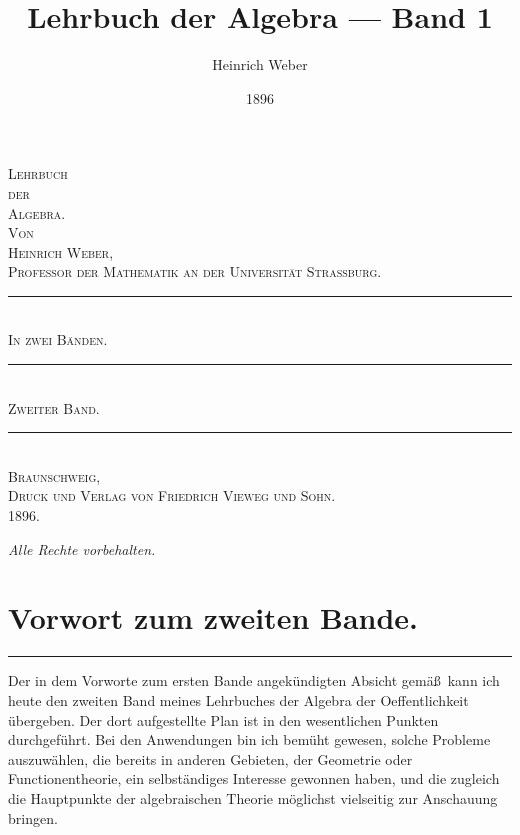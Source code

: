 \documentclass[12pt,a4paper]{book}
\title{Lehrbuch der Algebra --- Band 1}
\author{Heinrich Weber}
\date{1896}
\begin{document}
\frontmatter
\begin{titlepage}
\begin{center}
\vspace*{2cm}
{\Huge\textsc{Lehrbuch}}\\[0.5cm]
{\large\textsc{der}}\\[0.5cm]
{\Huge\textsc{Algebra.}}\\[1.5cm]
{\large\textsc{Von}}\\[0.5cm]
{\LARGE\textsc{Heinrich Weber,}}\\[0.3cm]
{\small\textsc{Professor der Mathematik an der Universit\"at Strassburg.}}\\[1.5cm]
\rule{5cm}{0.4pt}\\[0.5cm]
{\large\textsc{In zwei B\"anden.}}\\[0.8cm]
\rule{5cm}{0.4pt}\\[0.5cm]
{\Large\textsc{Zweiter Band.}}\\[2cm]
\rule{8cm}{0.4pt}\\[0.5cm]
{\large\textsc{Braunschweig,}}\\[0.3cm]
{\small\textsc{Druck und Verlag von Friedrich Vieweg und Sohn.}}\\[0.3cm]
{\large 1896.}
\end{center}
\end{titlepage}

\newpage
\thispagestyle{empty}
\vfill
\begin{center}
\textit{Alle Rechte vorbehalten.}
\end{center}
\vfill

\chapter*{Vorwort zum zweiten Bande.}

\begin{flushright}
\rule{5cm}{0.4pt}
\end{flushright}

Der in dem Vorworte zum ersten Bande angek\"undigten Absicht gem\"a\ss\ kann ich heute den zweiten Band meines Lehrbuches der Algebra der Oeffentlichkeit \"ubergeben. Der dort aufgestellte Plan ist in den wesentlichen Punkten durchgef\"uhrt. Bei den Anwendungen bin ich bem\"uht gewesen, solche Probleme auszuw\"ahlen, die bereits in anderen Gebieten, der Geometrie oder Functionentheorie, ein selbst\"andiges Interesse gewonnen haben, und die zugleich die Hauptpunkte der algebraischen Theorie m\"oglichst vielseitig zur Anschauung bringen.
\end{document}
